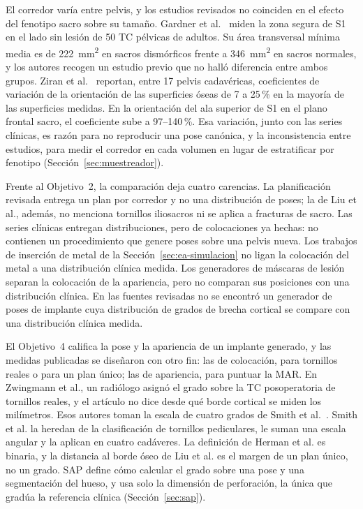 El corredor varía entre pelvis, y los estudios revisados no coinciden en el efecto del fenotipo sacro sobre su tamaño. Gardner et al.~\cite{gardner2010safezones} miden la zona segura de S1 en el lado sin lesión de 50 TC pélvicas de adultos. Su área transversal mínima media es de 222~mm\textsuperscript{2} en sacros dismórficos frente a 346~mm\textsuperscript{2} en sacros normales, y los autores recogen un estudio previo que no halló diferencia entre ambos grupos. Ziran et al.~\cite{ziran2007fluoroscopic} reportan, entre 17 pelvis cadavéricas, coeficientes de variación de la orientación de las superficies óseas de 7 a 25\,\% en la mayoría de las superficies medidas. En la orientación del ala superior de S1 en el plano frontal sacro, el coeficiente sube a 97--140\,\%. Esa variación, junto con las series clínicas, es razón para no reproducir una pose canónica, y la inconsistencia entre estudios, para medir el corredor en cada volumen en lugar de estratificar por fenotipo (Sección~\ref{sec:muestreador}).

Frente al Objetivo~2, la comparación deja cuatro carencias. La planificación revisada entrega un plan por corredor y no una distribución de poses; la de Liu et al., además, no menciona tornillos iliosacros ni se aplica a fracturas de sacro. Las series clínicas entregan distribuciones, pero de colocaciones ya hechas: no contienen un procedimiento que genere poses sobre una pelvis nueva. Los trabajos de inserción de metal de la Sección~\ref{sec:ea-simulacion} no ligan la colocación del metal a una distribución clínica medida. Los generadores de máscaras de lesión separan la colocación de la apariencia, pero no comparan sus posiciones con una distribución clínica. En las fuentes revisadas no se encontró un generador de poses de implante cuya distribución de grados de brecha cortical se compare con una distribución clínica medida.

El Objetivo~4 califica la pose y la apariencia de un implante generado, y las medidas publicadas se diseñaron con otro fin: las de colocación, para tornillos reales o para un plan único; las de apariencia, para puntuar la MAR. En Zwingmann et al., un radiólogo asignó el grado sobre la TC posoperatoria de tornillos reales, y el artículo no dice desde qué borde cortical se miden los milímetros. Esos autores toman la escala de cuatro grados de Smith et al.~\cite{smith2006iliosacral}. Smith et al. la heredan de la clasificación de tornillos pediculares, le suman una escala angular y la aplican en cuatro cadáveres. La definición de Herman et al. es binaria, y la distancia al borde óseo de Liu et al. es el margen de un plan único, no un grado. SAP define cómo calcular el grado sobre una pose y una segmentación del hueso, y usa solo la dimensión de perforación, la única que gradúa la referencia clínica (Sección~\ref{sec:sap}).

